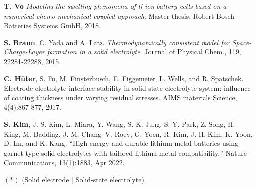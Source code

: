 \documentclass[25pt, a0paper,
portrait,
margin=5mm, innermargin=5mm, blockverticalspace=15mm, colspace=15mm, subcolspace=0mm]{tikzposter}
\begin{document}
\begin{columns}
{\begin{thebibliography}{2}
			\textbf{T. Vo} \emph{Modeling the swelling phenomena of li-ion battery
				cells based on a numerical chemo-mechanical coupled approach}. 
			Master thesis, Robert Bosch Batteries Systems GmbH, 2018.
			
			\textbf{S. Braun}, C. Yada and A. Latz. \emph{Thermodynamically consistent model for
				Space-Charge-Layer formation in a solid electrolyte}. 
			Journal of Physical Chem., 119, 22281-22288, 2015.
			
			\textbf{C. Hüter}, S. Fu, M. Finsterbusch, E. Figgemeier, L. Wells, and R. Spatschek. 
			Electrode-electrolyte interface stability in solid state electrolyte system: 
			influence of coating thickness under varying residual stresses. 
			AIMS materials Science, 4(4):867-877, 2017.
			
			\textbf{S. Kim}, J. S. Kim, L. Miara, Y. Wang, S. K. Jung, S. Y. Park, Z. Song, 
			H. King, M. Badding, J. M. Chang, V. Roev, G. Yoon, R. Kim, J. H. Kim, K. Yoon, D. Im, 
			and K. Kang. “High-energy and durable lithium metal batteries using garnet-type 
			solid electrolytes with tailored lithium-metal compatibility,” 
			Nature Communications, 13(1):1883, Apr 2022.
			
			$(*)$ (Solid electrode | Solid-state electrolyte)
		\end{thebibliography}
	}
\end{columns}
\end{document}
